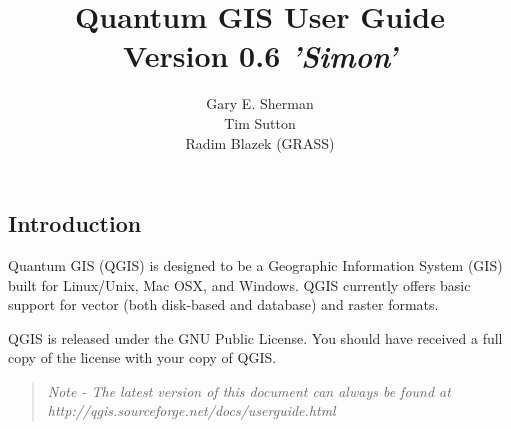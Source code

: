\documentclass[10pt,english]{article}
\title{Quantum GIS User Guide\\
\large Version 0.6 \textsl{'Simon'}}
\author{Gary E. Sherman \\Tim Sutton \\Radim Blazek (GRASS)}
\begin{document}
\setlength{\parindent}{0in}


\maketitle
\tableofcontents
{}

\pagestyle{fancy}


\begin{onehalfspace}
\reversemarginpar
\section{Introduction}
Quantum GIS (QGIS) is designed to be a Geographic Information System
(GIS) built for Linux/Unix, Mac OSX, and Windows. QGIS currently offers basic support for
vector (both disk-based and database) and raster formats. 

QGIS is released under the GNU Public License. You should have received a full copy of the license with your copy of QGIS.
\begin{quote}
\begin{singlespace}
\textsl{Note - The latest version of this document can always be found at\\
http://qgis.sourceforge.net/docs/userguide.html }
\end{singlespace}
\end{quote}

\end{onehalfspace}
\end{document}
